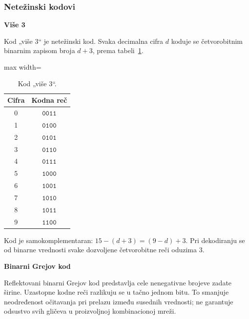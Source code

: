 \documentclass[a4paper,11pt]{article}
\numberwithin{equation}{section}
\newcommand{\redlinija}{\arrayrulecolor{black!28}\specialrule{0.3pt}{2pt}{2pt}\arrayrulecolor{black}}
\begin{document}
\FloatBarrier{}
\subsubsection{Netežinski kodovi}\label{sec:1.1.2}


\textbf{Više 3}



Kod „više 3“ je netežinski kod. Svaka decimalna cifra $d$ koduje se četvorobitnim binarnim zapisom broja $d+3$, prema tabeli~\ref{tab:excess}.



\begin{table}[!htbp]\centering\caption{Kod „više 3“.}\label{tab:excess}
\begin{adjustbox}{max width=\linewidth}\begin{tabular}{cc}\toprule
Cifra & Kodna reč\\\midrule
0 & $\mathtt{0011}$\\
\redlinija
1 & $\mathtt{0100}$\\
\redlinija
2 & $\mathtt{0101}$\\
\redlinija
3 & $\mathtt{0110}$\\
\redlinija
4 & $\mathtt{0111}$\\
\redlinija
5 & $\mathtt{1000}$\\
\redlinija
6 & $\mathtt{1001}$\\
\redlinija
7 & $\mathtt{1010}$\\
\redlinija
8 & $\mathtt{1011}$\\
\redlinija
9 & $\mathtt{1100}$\\
\bottomrule\end{tabular}\end{adjustbox}
\end{table}


Kod je samokomplementaran: $15-(d+3)=(9-d)+3$. Pri dekodiranju se od binarne vrednosti svake dozvoljene četvorobitne reči oduzima 3.

\textbf{Binarni Grejov kod}



Reflektovani binarni Grejov kod predstavlja cele nenegativne brojeve zadate širine. Uzastopne kodne reči razlikuju se u tačno jednom bitu. To smanjuje neodređenost očitavanja pri prelazu između susednih vrednosti; ne garantuje odsustvo svih gličeva u proizvoljnoj kombinacionoj mreži.
\end{document}

